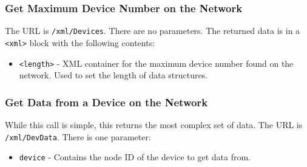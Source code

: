 \documentclass[10pt, openany, draft]{article}
\begin{document}
\subsubsection{Get Maximum Device Number on the Network}
The URL is \texttt{/xml/Devices}.  There are no parameters.  The returned data is in a \texttt{<xml>} block with the following contents:
\begin{itemize}
  \item \texttt{<length>} - XML container for the maximum device number found on the network.  Used to set the length of data structures.
\end{itemize}

\subsubsection{Get Data from a Device on the Network}
While this call is simple, this returns the most complex set of data.  The URL is \texttt{/xml/DevData}.  There is one parameter:
\begin{itemize}
  \item \texttt{device} - Contains the node ID of the device to get data from.
\end{itemize}
\end{document}
